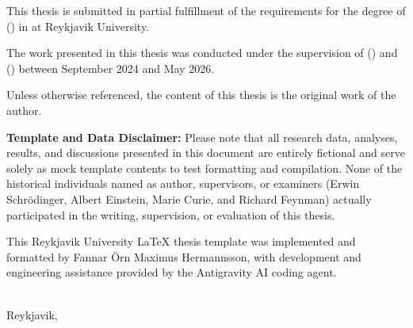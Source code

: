 
This thesis is submitted in partial fulfillment of the requirements for the degree of \thesisDegreeLong{} (\thesisDegreeAbbrv{}) in \thesisProgram{} at Reykjavik University.

The work presented in this thesis was conducted under the supervision of \thesisSupervisor{} (\thesisSupervisorAffiliation{}) and \thesisCoSupervisor{} (\thesisCoSupervisorAffiliation{}) between September 2024 and May 2026. 

Unless otherwise referenced, the content of this thesis is the original work of the author.

\vspace{\baselineskip}
\noindent\textbf{Template and Data Disclaimer:} Please note that all research data, analyses, results, and discussions presented in this document are entirely fictional and serve solely as mock template contents to test formatting and compilation. None of the historical individuals named as author, supervisors, or examiners (Erwin Schrödinger, Albert Einstein, Marie Curie, and Richard Feynman) actually participated in the writing, supervision, or evaluation of this thesis. 

This Reykjavik University LaTeX thesis template was implemented and formatted by Fannar Örn Maximus Hermannsson, with development and engineering assistance provided by the Antigravity AI coding agent.

\vspace{2\baselineskip}
\noindent\thesisAuthor\\
Reykjavik, \thesisDate
